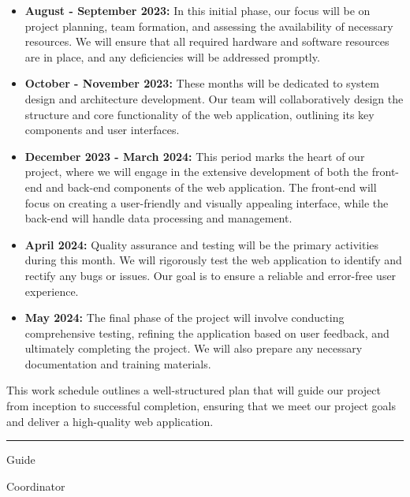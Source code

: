 \documentclass[twocolumn,10pt]{article}
\begin{document}
\begin{itemize}
  \item \textbf{August - September 2023:} In this initial phase, our focus will be on project planning, team formation, and assessing the availability of necessary resources. We will ensure that all required hardware and software resources are in place, and any deficiencies will be addressed promptly. 

  \item \textbf{October - November 2023:} These months will be dedicated to system design and architecture development. Our team will collaboratively design the structure and core functionality of the web application, outlining its key components and user interfaces.

  \item \textbf{December 2023 - March 2024:} This period marks the heart of our project, where we will engage in the extensive development of both the front-end and back-end components of the web application. The front-end will focus on creating a user-friendly and visually appealing interface, while the back-end will handle data processing and management.

  \item \textbf{April 2024:} Quality assurance and testing will be the primary activities during this month. We will rigorously test the web application to identify and rectify any bugs or issues. Our goal is to ensure a reliable and error-free user experience.

  \item \textbf{May 2024:} The final phase of the project will involve conducting comprehensive testing, refining the application based on user feedback, and ultimately completing the project. We will also prepare any necessary documentation and training materials.

\end{itemize}

This work schedule outlines a well-structured plan that will guide our project from inception to successful completion, ensuring that we meet our project goals and deliver a high-quality web application.


\nocite{*}


\hrule
\vspace{.5in}

Guide \\
\vspace{.5in}

Coordinator
\end{document}
